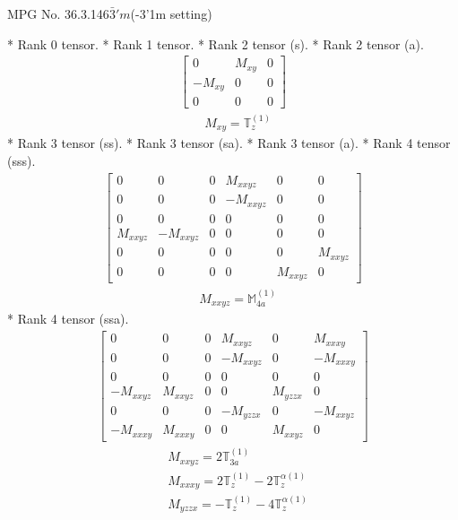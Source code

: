 \documentclass[fleqn,8pt,landscape]{jsarticle}
\begin{document}
\setcounter{MaxMatrixCols}{32}

\renewcommand{\tablename}{Table~}
\renewcommand{\figurename}{Figure~}
\begin{center}
\LARGE
MPG No. 36.3.146\quad$\bar{3}'m$\quad(-3'1m setting)
\end{center}
* Rank 0 tensor.
* Rank 1 tensor.
* Rank 2 tensor (s).
* Rank 2 tensor (a).
\begin{align*}
\begin{bmatrix} 0 & M_{xy} & 0 \\ - M_{xy} & 0 & 0 \\ 0 & 0 & 0 \end{bmatrix}
\end{align*}
\begin{align*}
& M_{xy} = \mathbb{T}_{z}^{(1)}
\end{align*}
* Rank 3 tensor (ss).
* Rank 3 tensor (sa).
* Rank 3 tensor (a).
* Rank 4 tensor (sss).
\begin{align*}
\begin{bmatrix} 0 & 0 & 0 & M_{xxyz} & 0 & 0 \\ 0 & 0 & 0 & - M_{xxyz} & 0 & 0 \\ 0 & 0 & 0 & 0 & 0 & 0 \\ M_{xxyz} & - M_{xxyz} & 0 & 0 & 0 & 0 \\ 0 & 0 & 0 & 0 & 0 & M_{xxyz} \\ 0 & 0 & 0 & 0 & M_{xxyz} & 0 \end{bmatrix}
\end{align*}
\begin{align*}
& M_{xxyz} = \mathbb{M}_{4a}^{(1)}
\end{align*}
* Rank 4 tensor (ssa).
\begin{align*}
\begin{bmatrix} 0 & 0 & 0 & M_{xxyz} & 0 & M_{xxxy} \\ 0 & 0 & 0 & - M_{xxyz} & 0 & - M_{xxxy} \\ 0 & 0 & 0 & 0 & 0 & 0 \\ - M_{xxyz} & M_{xxyz} & 0 & 0 & M_{yzzx} & 0 \\ 0 & 0 & 0 & - M_{yzzx} & 0 & - M_{xxyz} \\ - M_{xxxy} & M_{xxxy} & 0 & 0 & M_{xxyz} & 0 \end{bmatrix}
\end{align*}
\begin{align*}
& M_{xxyz} = 2 \mathbb{T}_{3a}^{(1)} \\
& M_{xxxy} = 2 \mathbb{T}_{z}^{(1)} - 2 \mathbb{T}_{z}^{\alpha(1)} \\
& M_{yzzx} = - \mathbb{T}_{z}^{(1)} - 4 \mathbb{T}_{z}^{\alpha(1)}
\end{align*}
\end{document}
